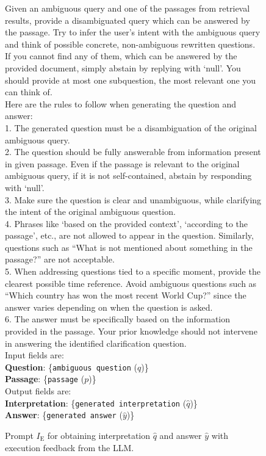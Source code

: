 \begin{figure*}[!htbp]
\centering
\begin{tcolorbox}[boxrule=0pt, title=Prompt for Verified Diversification]
Given an ambiguous query and one of the passages from retrieval results, provide a disambiguated query which can be answered by the passage.
Try to infer the user's intent with the ambiguous query and think of possible concrete, non-ambiguous rewritten questions.
If you cannot find any of them, which can be answered by the provided document, simply abstain by replying with `null'.
You should provide at most one subquestion, the most relevant one you can think of.\\

Here are the rules to follow when generating the question and answer:\\
1. The generated question must be a disambiguation of the original ambiguous query.\\
2. The question should be fully answerable from information present in given passage. Even if the passage is relevant to the original ambiguous query, if it is not self-contained, abstain by responding with `null'.\\
3. Make sure the question is clear and unambiguous, while clarifying the intent of the original ambiguous question.\\
4. Phrases like `based on the provided context', `according to the passage', etc., are not allowed to appear in the question. Similarly, questions such as ``What is not mentioned about something in the passage?'' are not acceptable.\\
5. When addressing questions tied to a specific moment, provide the clearest possible time reference. Avoid ambiguous questions such as ``Which country has won the most recent World Cup?'' since the answer varies depending on when the question is asked.\\
6. The answer must be specifically based on the information provided in the passage. Your prior knowledge should not intervene in answering the identified clarification question.\\

Input fields are:\\
\textbf{Question}: \{\texttt{ambiguous question} ($q$)\}\\
\textbf{Passage}: \{\texttt{passage} ($p$)\}\\

Output fields are:\\
\textbf{Interpretation}:  \{\texttt{generated interpretation} ($\hat{q}$)\} \\
\textbf{Answer}:  \{\texttt{generated answer} ($\hat{y}$)\}
\end{tcolorbox}
\caption{Prompt $I_{\textrm{E}}$ for obtaining interpretation $\hat{q}$ and answer $\hat{y}$ with execution feedback from the LLM.}
\label{fig:prompt_q_extract}
\end{figure*}




